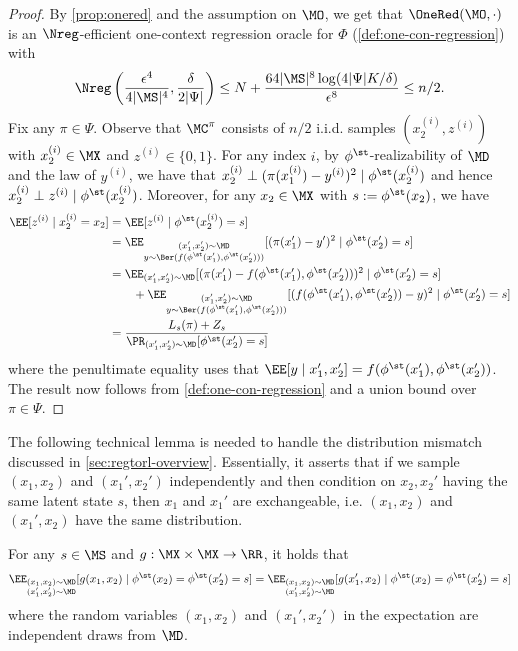 \begin{proof}
By \cref{prop:onered} and the assumption on $\MO$, we get that $\OneRed(\MO,\cdot)$ is an $\Nreg$-efficient one-context regression oracle for $\Phi$ (\cref{def:one-con-regression}) with 
\[\Nreg\left(\frac{\epsilon^4}{4|\MS|^4}, \frac{\delta}{2|\Psi|}\right) \leq N + \frac{64|\MS|^8 \log(4|\Psi| K/\delta)}{\epsilon^8} \leq n/2.\]
Fix any $\pi \in \Psi$. Observe that $\MC^\pi$ consists of $n/2$ i.i.d. samples $(x_2^{(i)}, z^{(i)})$ with $x_2^{(i)} \in \MX$ and $z^{(i)} \in \{0,1\}$. For any index $i$, by $\phi^\st$-realizability of $\MD$ and the law of $y^{(i)}$, we have that $x_2^{(i)} \perp (\pi(x_1^{(i)})-y^{(i)})^2 \mid{} \phi^\st(x_2^{(i)})$ and hence $x_2^{(i)} \perp z^{(i)} \mid{} \phi^\st(x_2^{(i)})$. Moreover, for any $x_2 \in \MX$ with $s := \phi^\st(x_2)$, we have
\begin{align*}
\EE[z^{(i)}\mid{}x_2^{(i)}=x_2] 
&= \EE[z^{(i)}\mid{}\phi^\st(x_2^{(i)}) = s] \\
&= \EE_{\substack{(x_1',x_2') \sim \MD \\ y \sim \Ber(f(\phi^\st(x_1'),\phi^\st(x_2')))}}[(\pi(x_1') - y')^2\mid{}\phi^\st(x_2')=s] \\ 
&= \EE_{(x_1',x_2') \sim \MD}[(\pi(x_1') - f(\phi^\st(x_1'),\phi^\st(x_2')))^2\mid{}\phi^\st(x_2')=s] \\ 
&\qquad+ \EE_{\substack{(x_1',x_2') \sim \MD \\ y \sim \Ber(f(\phi^\st(x_1'),\phi^\st(x_2')))}}[(f(\phi^\st(x_1'),\phi^\st(x_2')) - y)^2\mid{}\phi^\st(x_2')=s] \\ 
&= \frac{L_s(\pi) + Z_s}{\Pr_{(x_1',x_2') \sim \MD}[\phi^\st(x_2') = s]}
\end{align*}
where the penultimate equality uses that $\EE[y\mid{}x_1',x_2'] = f(\phi^\st(x_1'),\phi^\st(x_2'))$. The result now follows from \cref{def:one-con-regression} and a union bound over $\pi \in \Psi$.
\end{proof}

The following technical lemma is needed to handle the distribution mismatch discussed in \cref{sec:regtorl-overview}. Essentially, it asserts that if we sample $(x_1,x_2)$ and $(x_1',x_2')$ independently and then condition on $x_2, x_2'$ having the same latent state $s$, then $x_1$ and $x_1'$ are exchangeable, i.e. $(x_1,x_2)$ and $(x_1',x_2)$ have the same distribution.

\begin{lemma}\label{lemma:switching}
For any $s \in \MS$ and $g: \MX\times \MX \to \RR$, it holds that
\[\EE_{\substack{(x_1,x_2) \sim \MD \\ (x_1',x_2') \sim \MD}}[g(x_1,x_2)\mid{}\phi^\st(x_2)=\phi^\st(x_2')=s] = \EE_{\substack{(x_1,x_2) \sim \MD \\ (x_1',x_2') \sim \MD}}[g(x_1',x_2)\mid{}\phi^\st(x_2)=\phi^\st(x_2')=s]\]
where the random variables $(x_1,x_2)$ and $(x_1',x_2')$ in the expectation are independent draws from $\MD$.
\end{lemma}

